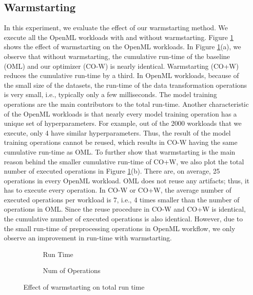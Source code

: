 \subsection{Warmstarting}
In this experiment, we evaluate the effect of our warmstarting method.
We execute all the OpenML workloads with and without warmstarting.
Figure \ref{exp-model-warmstarting} shows the effect of warmstarting on the OpenML workloads.
In Figure \ref{exp-model-warmstarting}(a), we observe that without warmstarting, the cumulative run-time of the baseline (OML) and our optimizer (CO-W) is nearly identical.
Warmstarting (CO+W) reduces the cumulative run-time by a third.
In OpenML workloads, because of the small size of the datasets, the run-time of the data transformation operations is very small, i.e., typically only a few milliseconds.
The model training operations are the main contributors to the total run-time.
Another characteristic of the OpenML workloads is that nearly every model training operation has a unique set of hyperparameters.
For example, out of the 2000 workloads that we execute, only 4 have similar hyperparameters.
Thus, the result of the model training operations cannot be reused, which results in CO-W having the same cumulative run-time as OML.
To further show that warmstarting is the main reason behind the smaller cumulative run-time of CO+W, we also plot the total number of executed operations in Figure \ref{exp-model-warmstarting}(b).
There are, on average, 25 operations in every OpenML workload.
OML does not reuse any artifacts; thus, it has to execute every operation.
In CO-W or CO+W, the average number of executed operations per workload is 7, i.e., 4 times smaller than the number of operations in OML.
Since the reuse procedure in CO-W and CO+W is identical, the cumulative number of executed operations is also identical.
However, due to the small run-time of preprocessing operations in OpenML workflow, we only observe an improvement in run-time with warmstarting.  



\begin{figure}
\begin{subfigure}[b]{0.5\linewidth}
\centering
 \resizebox{\columnwidth}{!}{%
%
}
\caption{Run Time}
\end{subfigure}%
\begin{subfigure}[b]{0.5\linewidth}
\centering
 \resizebox{\columnwidth}{!}{%
%
}
\caption{Num of Operations}
\end{subfigure}
\caption{Effect of warmstarting on total run time}
\label{exp-model-warmstarting}
\end{figure}
